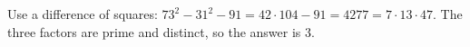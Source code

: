 Use a difference of squares: $73^2-31^2-91=42\cdot104-91=4277=7\cdot13\cdot47$. The three factors are prime and distinct, so the answer is $\boxed3$.
